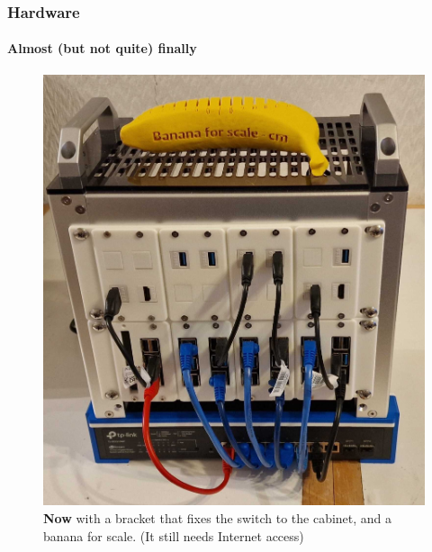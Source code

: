 
\begin{frame}
	\frametitle{Hardware}
	\framesubtitle{Almost (but not quite) finally}
	\begin{figure}
		\includegraphics[height=0.60\textheight]{graphics/banana_for_scale.jpg}
		\caption{{\large\bf{Now}} with a bracket that fixes the switch to the cabinet, and a banana for scale. \linebreak
			{\tiny(It still needs Internet access)}}
	\end{figure}
\end{frame}